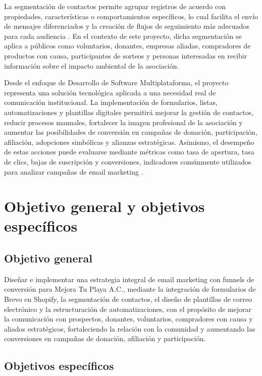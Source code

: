 La segmentación de contactos permite agrupar registros de acuerdo con propiedades, características o comportamientos específicos, lo cual facilita el envío de mensajes diferenciados y la creación de flujos de seguimiento más adecuados para cada audiencia \cite{hubspot_segments}. En el contexto de este proyecto, dicha segmentación se aplica a públicos como voluntarios, donantes, empresas aliadas, compradores de productos con causa, participantes de sorteos y personas interesadas en recibir información sobre el impacto ambiental de la asociación.

Desde el enfoque de Desarrollo de Software Multiplataforma, el proyecto representa una solución tecnológica aplicada a una necesidad real de comunicación institucional. La implementación de formularios, listas, automatizaciones y plantillas digitales permitirá mejorar la gestión de contactos, reducir procesos manuales, fortalecer la imagen profesional de la asociación y aumentar las posibilidades de conversión en campañas de donación, participación, afiliación, adopciones simbólicas y alianzas estratégicas. Asimismo, el desempeño de estas acciones puede evaluarse mediante métricas como tasa de apertura, tasa de clics, bajas de suscripción y conversiones, indicadores comúnmente utilizados para analizar campañas de email marketing \cite{mailchimp_benchmarks}.

\section{Objetivo general y objetivos específicos}

\subsection{Objetivo general}

Diseñar e implementar una estrategia integral de email marketing con funnels de conversión para Mejora Tu Playa A.C., mediante la integración de formularios de Brevo en Shopify, la segmentación de contactos, el diseño de plantillas de correo electrónico y la estructuración de automatizaciones, con el propósito de mejorar la comunicación con prospectos, donantes, voluntarios, compradores con causa y aliados estratégicos, fortaleciendo la relación con la comunidad y aumentando las conversiones en campañas de donación, afiliación y participación.

\subsection{Objetivos específicos}

